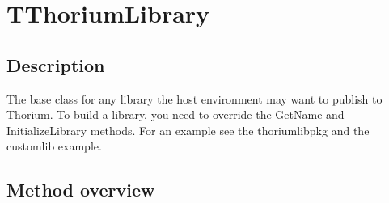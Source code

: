 \section{TThoriumLibrary}
\label{thoriumcorepkg:thorium:tthoriumlibrary}
\subsection{Description}
The base class for any library the host environment may want to publish to Thorium. To build a library, you need to override the GetName and InitializeLibrary methods. For an example see the thoriumlibpkg and the customlib example.%
\subsection{Method overview}
\label{thoriumcorepkg:thorium:tthoriumlibrary:methods}
